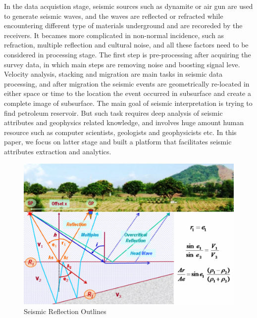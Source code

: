 In the data acquistion stage, seismic sources such as dynamite or air gun are used to generate seismic waves, and the waves are reflected or refracted while encountering different type of materials underground and are recoreded by the receivers. It becames more complicated in non-normal incidence, such as refraction, multiple reflection and cultural noise, and all these factors need to be considered in processing stage. The first step is pre-processing after acquiring the survey data, in which main steps are removing noise and boosting signal leve. Velocity analysis, stacking and migration are main tasks in seismic data processing, and after migration the seismic events are geometrically re-located in either space or time to the location the event occurred in subsurface and create a complete image of subsurface\cite{seisreflection}. The main goal of seismic interpretation is trying to find petroleum reservoir. But such task requires deep analysis of seismic attributes and geophysics related knowledge, and involves huge amount human resource such as computer scientists, geologists and geophysicists etc. In this paper, we focus on latter stage and built a platform that facilitates seismic attributes extraction and analytics.   

\begin{figure}[h]
\centering
\includegraphics[scale=1]{seismic_reflection_principal.png}
\caption{Seismic Reflection Outlines\cite{seisreflection}}
\label{seismic_reflection}
\end{figure}



